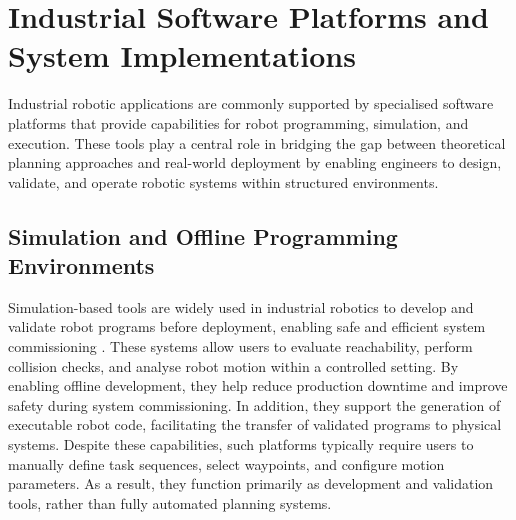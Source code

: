 \section{Industrial Software Platforms and System Implementations}
Industrial robotic applications are commonly supported by specialised software platforms that provide capabilities for robot programming, simulation, and execution. These tools play a central role in bridging the gap between theoretical planning approaches and real-world deployment by enabling engineers to design, validate, and operate robotic systems within structured environments.
\subsection{Simulation and Offline Programming Environments}
Simulation-based tools are widely used in industrial robotics to develop and validate robot programs before deployment, enabling safe and efficient system commissioning \cite{Chryssolouris2013}. These systems allow users to evaluate reachability, perform collision checks, and analyse robot motion within a controlled setting. By enabling offline development, they help reduce production downtime and improve safety during system commissioning. In addition, they support the generation of executable robot code, facilitating the transfer of validated programs to physical systems.
Despite these capabilities, such platforms typically require users to manually define task sequences, select waypoints, and configure motion parameters. As a result, they function primarily as development and validation tools, rather than fully automated planning systems.
